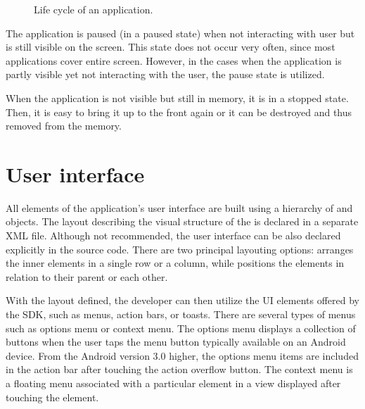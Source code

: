 \begin{figure}[h!]
    \caption{Life cycle of an application.}
\end{figure}

The application is paused (in a paused state) when not interacting with user but is still visible on the screen.
This state does not occur very often, since most applications cover entire screen.
However, in the cases when the application is partly visible yet not interacting with the user, the pause state is utilized. 

When the application is not visible but still in memory, it is in a stopped state.
Then, it is easy to bring it up to the front again or it can be destroyed and thus removed from the memory.

\section{User interface}
\label{sec:ui}

All elements of the application's user interface are built using a hierarchy of  and  objects.
The layout describing the visual structure of the  is declared in a separate XML file.
Although not recommended, the user interface can be also declared explicitly in the source code. 
There are two principal layouting options:  arranges the inner elements in a single row or a column,
while  positions the elements in relation to their parent or each other.

With the layout defined, the developer can then utilize the UI elements offered by the SDK, such as menus, action bars,  or toasts.
There are several types of menus such as options menu or context menu. 
The options menu displays a collection of buttons when the user taps the menu button typically available on an Android device. 
From the Android version 3\@.0 higher, the options menu items are included in the action bar after touching the action overflow button. 
The context menu is a floating menu associated with a particular element in a view displayed after touching the element.


